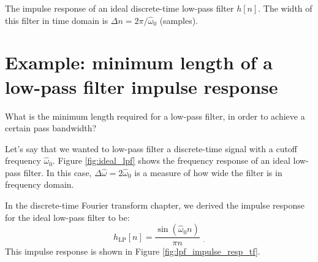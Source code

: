 \begin{marginfigure}
\begin{center}
\end{center}
\caption{The impulse response of an ideal discrete-time low-pass filter $h[n]$. The width of this filter in time domain is $\Delta n = 2\pi/\hat{\omega}_0$ (samples).}
\label{fig:lpf_impulse_resp_tf}
\end{marginfigure}

\section{Example: minimum length of a low-pass filter impulse response}

What is the minimum length required for a low-pass filter, in order to achieve a certain pass bandwidth?

Let's say that we wanted to low-pass filter a discrete-time signal
with a cutoff frequency $\hat{\omega}_0$. Figure \ref{fig:ideal_lpf}
shows the frequency response of an ideal low-pass filter. In this case,
$\Delta \hat{\omega} = 2\hat{\omega}_0$ is a measure of how wide the
filter is in frequency domain.

In the discrete-time Fourier transform chapter, we derived the impulse
response for the ideal low-pass filter to be:
\begin{equation}
h_{\mathrm{LP}}[n] = \frac{\sin(\hat{\omega}_0 n)}{\pi n} \,\, _.
\end{equation}
This impulse response is shown in
Figure \ref{fig:lpf_impulse_resp_tf}.

